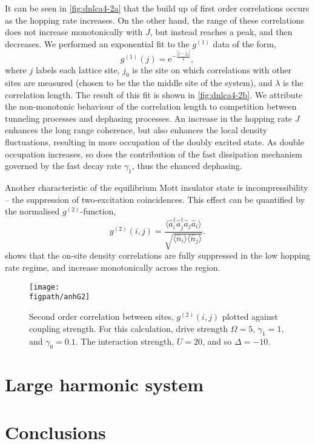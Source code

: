 It can be seen in \cref{fig:dnlca4-2a} that the build up of first order correlations occurs as the hopping rate increases. On the other hand, the range of these correlations does not increase monotonically with \(J\), but instead reaches a peak, and then decreases. We performed an exponential fit to the \(g^{(1)}\) data of the form,
\begin{equation}
	g^{(1)}(j) = \mathrm{e}^{-\frac{|j-j_{0}|}{\lambda}},
	\label{eq:dnlca4-2}
\end{equation}
where \(j\) labels each lattice site, \(j_{0}\) is the site on which correlations with other sites are measured (chosen to be the the middle site of the system), and \(\lambda\) is the correlation length. The result of this fit is shown in \cref{fig:dnlca4-2b}. We attribute the non-monotonic behaviour of the correlation length to competition between tunneling processes and dephasing processes. An increase in the hopping rate \(J\) enhances the long range coherence, but also enhances the local density fluctuations, resulting in more occupation of the doubly excited state. As double occupation increases, so does the contribution of the fast dissipation mechanism governed by the fast decay rate \(\gamma_{1}\), thus the ehanced dephasing.

Another characteristic of the equilibrium Mott insulator state is incompressibility -- the suppression of two-excitation coincidences. This effect can be quantified by the normalised \(g^{(2)}\)-function,
\begin{equation}
	g^{(2)}(i,j) = \frac{\langle \hat{a}_{i}^{\dagger}\hat{a}_{j}^{\dagger}\hat{a}_{j}\hat{a}_{i} \rangle}{\sqrt{\langle \hat{n}_{i} \rangle \langle \hat{n}_{j} \rangle}}.
	\label{eq:dnlca4-3}
\end{equation}
 shows that the on-site density correlations are fully suppressed in the low hopping rate regime, and increase monotonically across the region.

\begin{figure}[ht]
	\centering
	\texttt{[image: \\figpath/anhG2]}
	\caption{\label{fig:dnlca4-3} Second order correlation between sites, \(g^{(2)}(i,j)\) plotted against coupling strength. For this calculation, drive strength \(\Omega = 5\), \(\gamma_{1} = 1\), and \(\gamma_{0} = 0.1\). The interaction strength, \(U=20\), and so \(\Delta = -10\).}
\end{figure}

\section{Large harmonic system}

\section{Conclusions}

